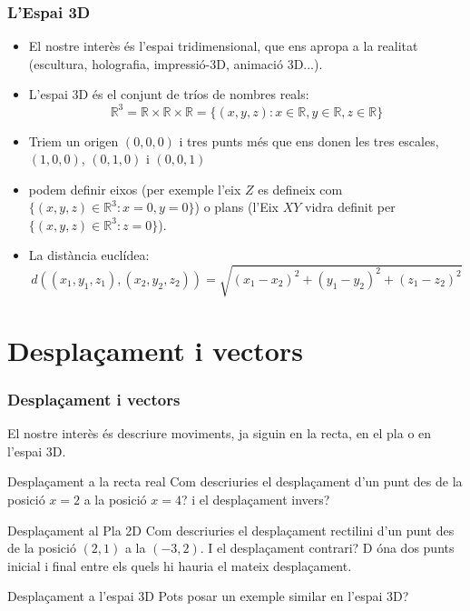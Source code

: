 \documentclass{beamer}
\begin{document}
\begin{frame}
\frametitle{L'Espai 3D}
\begin{itemize}
  \item El nostre interès és l'espai tridimensional, que ens apropa a la realitat (escultura, holografia, impressió-3D, animació 3D...).
  \item L'espai 3D és el conjunt de tríos de nombres reals:
  \begin{equation}
    \mathbb{R}^3 = \mathbb{R} \times \mathbb{R} \times \mathbb{R} = \{(x,y,z): x \in \mathbb{R}, y \in \mathbb{R}, z \in \mathbb{R} \}
  \end{equation}
  \item Triem un origen $(0,0,0)$ i tres punts més que ens donen les tres escales, $(1,0,0)$, $(0,1,0)$ i $(0,0,1)$
  \item podem definir eixos (per exemple l'eix $Z$ es defineix com $\{(x,y,z)\in \mathbb{R}^3:x=0, y=0\}$) o plans (l'Eix $XY$ vidra definit per $\{(x,y,z)\in \mathbb{R}^3:z=0\}$).
  \item La distància euclídea:
\begin{equation}
  d\left( (x_1,y_1,z_1),(x_2,y_2,z_2) \right) = \sqrt{(x_1-x_2)^2+(y_1-y_2)^2+(z_1-z_2)^2}
\end{equation}
\end{itemize}
\end{frame}

\section{Desplaçament i vectors}
\begin{frame}
\frametitle{Desplaçament i vectors}

El nostre interès és descriure moviments, ja siguin en la recta, en el pla o en l'espai 3D.

\begin{exampleblock}{Desplaçament a la recta real}
Com descriuries el desplaçament d'un punt des de la posició $x=2$ a la posició $x=4$? i el desplaçament invers?
\end{exampleblock}

\begin{exampleblock}{Desplaçament al Pla 2D}
Com descriuries el desplaçament rectilini d'un punt des de la posició $(2,1)$ a la $(-3,2)$. I el desplaçament contrari? D
óna dos punts inicial i final entre els quels hi hauria el mateix desplaçament.
\end{exampleblock}

\begin{block}{Desplaçament a l'espai 3D}
Pots posar un exemple similar en l'espai 3D?
\end{block}
\end{frame}
\end{document}
